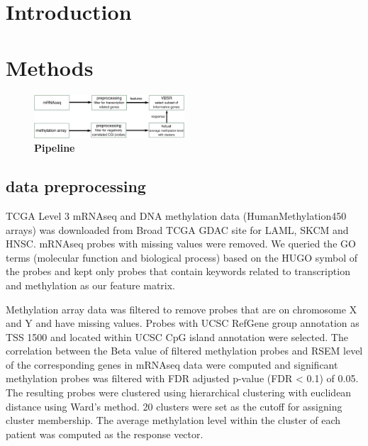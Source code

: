 \documentclass{article}
\begin{document}
\printAffiliationsAndNotice{\icmlEqualContribution} %

\begin{abstract} 
\end{abstract}

\section{Introduction}

\section{Methods}
\begin{figure}[h]
\includegraphics[width=0.5\textwidth]{../figs/flowChart}
\caption{\textbf{Pipeline}}
\end{figure}
\subsection{data preprocessing}
TCGA Level 3 mRNAseq and DNA methylation data (HumanMethylation450 arrays) was downloaded from Broad TCGA GDAC site for LAML, SKCM and HNSC. mRNAseq probes with missing values were removed. We queried the GO terms (molecular function and biological process) based on the HUGO symbol of the probes and kept only probes that contain keywords related to transcription and methylation as our feature matrix.   

Methylation array data was filtered to remove probes that are on chromosome X and Y and have missing values. Probes with UCSC RefGene group annotation as TSS 1500 and located within UCSC CpG island annotation were selected. The correlation between the Beta value of filtered methylation probes and RSEM level of the corresponding genes in mRNAseq data were computed and significant methylation probes was filtered with FDR adjusted p-value (FDR < 0.1) of 0.05. The resulting probes were clustered using hierarchical clustering with euclidean distance using Ward's method. 20 clusters were set as the cutoff for assigning cluster membership. The average methylation level within the cluster of each patient was computed as the response vector. 
\end{document}
